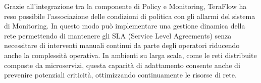 Grazie all'integrazione tra la componente di Policy e Monitoring, TeraFlow ha reso possibile l'associazione delle condizioni di politica con gli allarmi del sistema di Monitoring.
In questo modo può implementare una gestione dinamica della rete 
permettendo di mantenere gli SLA (Service Level Agreements) senza necessitare di interventi manuali continui da parte degli operatori riducendo anche la complessità operativa.
In ambienti su larga scala, come le reti distribuite composte da microservizi, questa capacità di adattamento consente anche di prevenire potenziali criticità, ottimizzando continuamente le risorse di rete.


